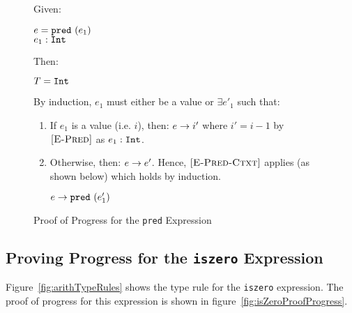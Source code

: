 \documentclass{report}
\newcommand{\rel}[1]{\mbox{\sc [#1]}}
\begin{document}
\begin{figure}[ht!]
Given:
\begin{center}
  $e = \mbox{\tt pred}~(e_1)$ \\
  ${e_1} : {\mbox{\tt Int}}$
\end{center}
Then:~\\
\begin{center}
   $T = \mbox{\tt Int}$
\end{center}

By induction, $e_1$ must either be a value or $\exists e'_1$ such that:~\\

	\begin{enumerate}
    \item If $e_1$ is a value (i.e. $i$), then: ${e} \rightarrow {i'}$ where $i' = i - 1$ by $\rel{E-Pred}$ as ${e_1} : {\mbox{\tt Int}}$.
      
    \item Otherwise, then: ${e} \rightarrow {e'}$.  Hence, $\rel{E-Pred-Ctxt}$ applies (as shown below) which holds by induction.
    
    \begin{center}
      ${e} \rightarrow {\mbox{\tt pred}~(e'_1)}$
    \end{center}
	
	\end{enumerate}
	
  \caption{Proof of Progress for the \texttt{pred} Expression}\label{fig:predProofProgress}
\end{figure}

\subsection{Proving Progress for the \texttt{iszero} Expression}

Figure~\ref{fig:arithTypeRules} shows the type rule for the \texttt{iszero} expression.  The proof of progress for this expression is shown in figure~\ref{fig:isZeroProofProgress}.
\end{document}
